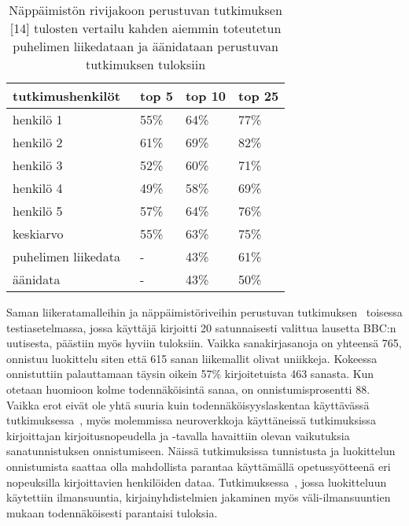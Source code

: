 \documentclass[finnish]{tktltiki2}
\theoremstyle{definition}
\theoremstyle{remark}
\begin{document}
\begin{table} [h]
    \begin{tabular}{ | l | p{25mm} | p{25mm} | p{25mm} | }
    \toprule
      tutkimushenkilöt~\cite{liu} &  top 5 & top 10 & top 25  \\
      \bottomrule
      henkilö 1 & 55\%  & 64\% & 77\%  \\
      \arrayrulecolor{lightgray}
      \midrule
      henkilö 2 & 61\% & 69\% & 82\% \\
      \midrule
      henkilö 3 & 52\% & 60\% & 71\% \\
      \midrule
      henkilö 4 & 49\% & 58\% & 69\% \\
      \midrule
      henkilö 5 & 57\% & 64\% & 76\% \\
      \midrule
      keskiarvo & 55\% & 63\% & 75\% \\
      \arrayrulecolor{black}
      \midrule
      puhelimen liikedata~\cite{berger} & - & 43\% & 61\% \\
      \midrule
      äänidata~\cite{mar} & - & 43\% & 50\% \\
      \bottomrule
    \end{tabular}
    \caption{Näppäimistön rivijakoon perustuvan tutkimuksen [14] tulosten vertailu kahden aiemmin toteutetun puhelimen liikedataan ja äänidataan perustuvan tutkimuksen tuloksiin}\label{t:3}
\end{table}


Saman liikeratamalleihin ja näppäimistöriveihin perustuvan tutkimuksen~\cite{liu} toisessa testiasetelmassa, jossa käyttäjä kirjoitti 20 satunnaisesti valittua lausetta BBC:n uutisesta, päästiin myös hyviin tuloksiin. Vaikka sanakirjasanoja on yhteensä 765, onnistuu luokittelu siten että 615 sanan liikemallit olivat uniikkeja. Kokeessa onnistuttiin palauttamaan täysin oikein 57\% kirjoitetuista 463 sanasta. Kun otetaan huomioon kolme todennäköisintä sanaa, on onnistumisprosentti 88.
Vaikka erot eivät ole yhtä suuria kuin todennäköisyyslaskentaa käyttävässä tutkimuksessa~\cite{mole}, myös molemmissa neuroverkkoja käyttäneissä tutkimuksissa kirjoittajan kirjoitusnopeudella ja -tavalla havaittiin olevan vaikutuksia sanatunnistuksen onnistumiseen. Näissä tutkimuksissa tunnistusta ja luokittelun onnistumista saattaa olla mahdollista parantaa käyttämällä opetussyötteenä eri nopeuksilla kirjoittavien henkilöiden dataa. Tutkimuksessa~\cite{maiti}, jossa luokitteluun käytettiin ilmansuuntia, kirjainyhdistelmien jakaminen myös väli-ilmansuuntien mukaan todennäköisesti parantaisi tuloksia.
\end{document}
